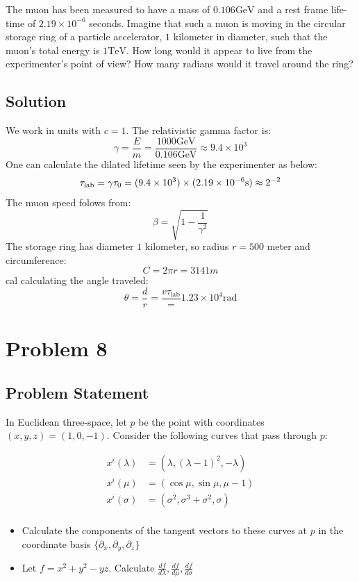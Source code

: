\documentclass[10pt,twocoloumn]{article}
\begin{document}
The muon has been measured to have a mass of $0.106\text{GeV}$ and a rest frame life-time of $2.19\times 10^{-6}$ seconds. Imagine that such a muon is moving in the circular storage ring of a particle accelerator, $1$ kilometer in diameter, such that the muon's total energy is $1 \text{TeV}$. How long would it appear to live from the experimenter's point of view? How many radians would it travel around the ring?

\subsection*{Solution}
We work in units with $c=1$. The relativistic gamma factor is:
\begin{equation}
    \gamma=\frac{E}{m} = \frac{1000\text{GeV}}{0.106\text{GeV}} \approx 9.4\times 10^3
\end{equation}
One can calculate the dilated lifetime seen by the experimenter as below:
\begin{equation}
    \tau_{\text{lab}} = \gamma \tau_0 = (9.4 \times 10^3)\times(2.19\times 10^{-6}\text{s})\approx 2\time 10^{-2}
\end{equation}
The muon speed folows from:
\begin{equation}
    \beta = \sqrt{1-\frac{1}{\gamma^2}}
\end{equation}
The storage ring has diameter $1$ kilometer, so radius $r=500$ meter and circumference:
\begin{equation}
    C = 2\pi r = 3141 m
\end{equation}
cal calculating the angle traveled:
\begin{equation}
    \theta = \frac{d}{r} = \frac{v \tau_{\text{lab}}} = 1.23\times 10^4\text{rad}
\end{equation}
\section*{Problem 8}
\subsection*{Problem Statement}
In Euclidean three-space, let $p$ be the point with coordinates $(x,y,z) = (1,0,-1)$. Consider the following curves that pass through $p$:

\begin{align}
x^i(\lambda) &= (\lambda, (\lambda - 1)^2, -\lambda) \\
x^i (\mu) &= (\cos\mu,\sin\mu,\mu-1)\\
x^i(\sigma)&=(\sigma^2,\sigma^3+\sigma^2,\sigma)\\
\end{align}
\begin{itemize}
\item Calculate the components of the tangent vectors to these curves at $p$ in the coordinate basis $\{\partial_x,\partial_y,\partial_z\}$
\item Let $f=x^2 + y^2 - yz$. Calculate $\frac{df}{d\lambda},\frac{df}{d\mu},\frac{df}{d\sigma}$
\end{itemize}
\end{document}
